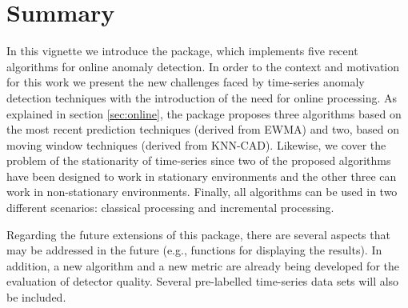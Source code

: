 \documentclass[a4paper]{article}\usepackage[]{graphicx}\usepackage[]{color}
\begin{document}
\section{Summary}\label{sec:summary}

In this vignette we introduce the  package, which implements five recent algorithms for online anomaly detection. In order to the context and motivation for this work we present the new challenges faced by time-series anomaly detection techniques with the introduction of the need for online processing. As explained in section \ref{sec:online}, the package proposes three algorithms based on the most recent prediction techniques (derived from EWMA) and two, based on moving window techniques (derived from KNN-CAD). Likewise, we cover the problem of the stationarity of time-series since two of the proposed algorithms have been designed to work in stationary environments and the other three can work in non-stationary environments. Finally, all algorithms can be used in two different scenarios: classical processing and incremental processing.

Regarding the future extensions of this package, there are several aspects that may be addressed in the future  (e.g., functions for displaying the results). In addition, a new algorithm and a new metric are already being developed for the evaluation of detector quality. Several pre-labelled time-series data sets will also be included.



\end{document}
